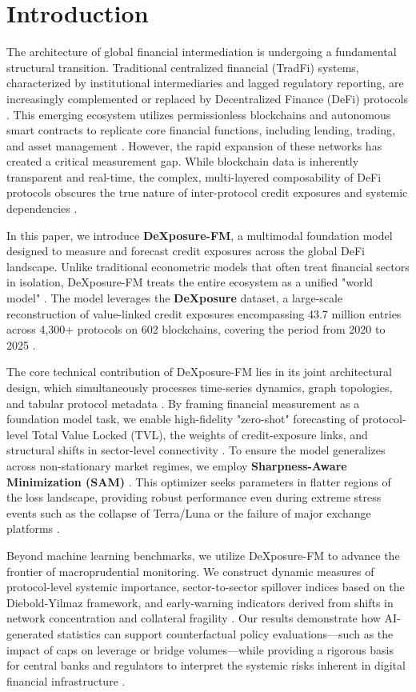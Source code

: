 
\section{Introduction}

The architecture of global financial intermediation is undergoing a fundamental structural transition. Traditional centralized financial (TradFi) systems, characterized by institutional intermediaries and lagged regulatory reporting, are increasingly complemented or replaced by Decentralized Finance (DeFi) protocols \cite{}. This emerging ecosystem utilizes permissionless blockchains and autonomous smart contracts to replicate core financial functions, including lending, trading, and asset management \cite{}. However, the rapid expansion of these networks has created a critical measurement gap. While blockchain data is inherently transparent and real-time, the complex, multi-layered composability of DeFi protocols obscures the true nature of inter-protocol credit exposures and systemic dependencies \cite{[8]}.

In this paper, we introduce \textbf{DeXposure-FM}, a multimodal foundation model designed to measure and forecast credit exposures across the global DeFi landscape. Unlike traditional econometric models that often treat financial sectors in isolation, DeXposure-FM treats the entire ecosystem as a unified "world model" \cite{}. The model leverages the \textbf{DeXposure} dataset, a large-scale reconstruction of value-linked credit exposures encompassing 43.7 million entries across 4,300+ protocols on 602 blockchains, covering the period from 2020 to 2025 \cite{[15, 17, 19]}. 

The core technical contribution of DeXposure-FM lies in its joint architectural design, which simultaneously processes time-series dynamics, graph topologies, and tabular protocol metadata \cite{}. By framing financial measurement as a foundation model task, we enable high-fidelity "zero-shot" forecasting of protocol-level Total Value Locked (TVL), the weights of credit-exposure links, and structural shifts in sector-level connectivity \cite{}. To ensure the model generalizes across non-stationary market regimes, we employ \textbf{Sharpness-Aware Minimization (SAM)} \cite{}. This optimizer seeks parameters in flatter regions of the loss landscape, providing robust performance even during extreme stress events such as the collapse of Terra/Luna or the failure of major exchange platforms \cite{}.

Beyond machine learning benchmarks, we utilize DeXposure-FM to advance the frontier of macroprudential monitoring. We construct dynamic measures of protocol-level systemic importance, sector-to-sector spillover indices based on the Diebold-Yilmaz framework, and early-warning indicators derived from shifts in network concentration and collateral fragility \cite{[5, 16, 18, 37]}. Our results demonstrate how AI-generated statistics can support counterfactual policy evaluations—such as the impact of caps on leverage or bridge volumes—while providing a rigorous basis for central banks and regulators to interpret the systemic risks inherent in digital financial infrastructure \cite{[7, 40, 49]}.

